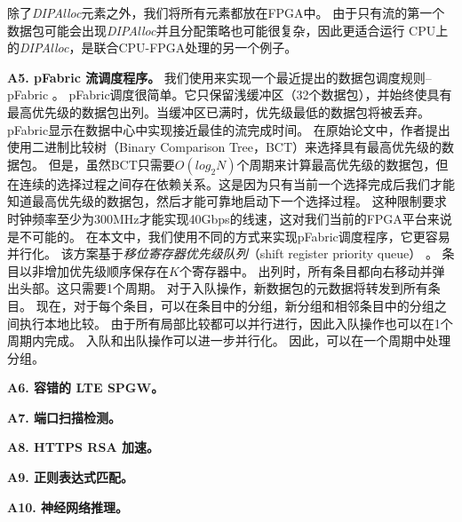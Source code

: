 除了\textit {DIPAlloc}元素之外，我们将所有元素都放在FPGA中。
由于只有流的第一个数据包可能会出现\textit {DIPAlloc}并且分配策略也可能很复杂，因此更适合运行
CPU上的\textit {DIPAlloc}，是联合CPU-FPGA处理的另一个例子。

%



\textbf {A5. pFabric 流调度程序。}
我们使用\name 来实现一个最近提出的数据包调度规则--pFabric \cite {pfabric}。
pFabric调度很简单。它只保留浅缓冲区（32个数据包），并始终使具有最高优先级的数据包出列。当缓冲区已满时，优先级最低的数据包将被丢弃。
pFabric显示在数据中心中实现接近最佳的流完成时间。
在原始论文中，作者提出使用二进制比较树（Binary Comparison Tree，BCT）来选择具有最高优先级的数据包。
但是，虽然BCT只需要$O(log_2 N)$个周期来计算最高优先级的数据包，但在连续的选择过程之间存在依赖关系。这是因为只有当前一个选择完成后我们才能知道最高优先级的数据包，然后才能可靠地启动下一个选择过程。
这种限制要求时钟频率至少为300MHz才能实现40Gbps的线速，这对我们当前的FPGA平台来说是不可能的。
在本文中，我们使用不同的方式来实现pFabric调度程序，它更容易并行化。
该方案基于\textit{移位寄存器优先级队列}（shift register priority queue） \cite {moon2000scalable}。
条目以非增加优先级顺序保存在$K$个寄存器中。
出列时，所有条目都向右移动并弹出头部。这只需要1个周期。
对于入队操作，新数据包的元数据将转发到所有条目。
现在，对于每个条目，可以在条目中的分组，新分组和相邻条目中的分组之间执行本地比较。
由于所有局部比较都可以并行进行，因此入队操作也可以在1个周期内完成。
入队和出队操作可以进一步并行化。
因此，可以在一个周期中处理分组。

\textbf{A6. 容错的 LTE SPGW。}

\textbf{A7. 端口扫描检测。}

\textbf{A8. HTTPS RSA 加速。}

\textbf{A9. 正则表达式匹配。}

\textbf{A10. 神经网络推理。}

